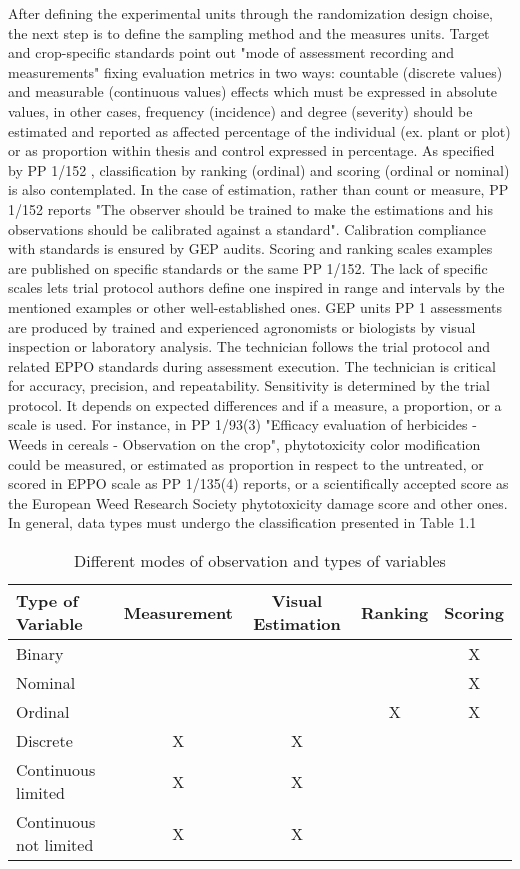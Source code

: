 \documentclass[12pt,a4paper,oneside]{report}
\begin{document}
After defining the experimental units through the randomization design choise,
the next step is to define the sampling method and the measures units.
Target and crop-specific standards point out "mode of
assessment recording and measurements" fixing evaluation metrics in two ways:
countable (discrete values) and measurable (continuous values) effects which must be
expressed in absolute values, in other cases, frequency (incidence) and degree
(severity) should be estimated and reported as affected percentage of the individual (ex.
plant or plot) or as proportion within thesis and control expressed in percentage. As
specified by PP 1/152 \cite{EPPO_PP1_152}, classification by ranking (ordinal) and scoring (ordinal or
nominal) is also contemplated. In the case of estimation, rather than count or measure,
PP 1/152 reports "The observer should be trained to make the estimations and his
observations should be calibrated against a standard". Calibration compliance with
standards is ensured by GEP audits. Scoring and ranking scales examples are
published on specific standards or the same PP 1/152. The lack of specific scales lets
trial protocol authors define one inspired in range and intervals by the mentioned
examples or other well-established ones.
GEP units PP 1 assessments are produced by trained and experienced
agronomists or biologists by visual inspection or laboratory analysis. The technician
follows the trial protocol and related EPPO standards during assessment execution. The
technician is critical for accuracy, precision, and repeatability. Sensitivity is determined
by the trial protocol. It depends on expected differences and if a measure, a proportion,
or a scale is used. For instance, in PP 1/93(3) \cite{EPPO_PP1_93} "Efficacy evaluation of herbicides -
Weeds in cereals - Observation on the crop", phytotoxicity color modification could be
measured, or estimated as proportion in respect to the untreated, or scored in EPPO
scale as PP 1/135(4) reports, or a scientifically accepted score as the European Weed
Research Society phytotoxicity damage score \cite{EWRS_score} and other ones.
In general, data types must undergo the classification presented in Table 1.1

\begin{table}[ht]
\caption{Different modes of observation and types of variables}
\label{tab:data_types}
\centering
\begin{tabular}{|l|c|c|c|c|}
\hline
\textbf{Type of Variable} & \textbf{Measurement} & \textbf{Visual Estimation} & \textbf{Ranking} & \textbf{Scoring} \\
\hline
Binary & & & & X \\
\hline
Nominal & & & & X \\
\hline
Ordinal & & & X & X \\
\hline
Discrete & X & X & & \\
\hline
Continuous limited & X & X & & \\
\hline
Continuous not limited & X & X & & \\
\hline
\end{tabular}
\end{table}
\end{document}
